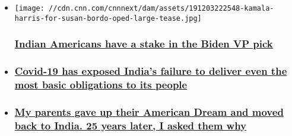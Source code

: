 \begin{itemize}
\item
  \href{/2020/08/03/opinions/kamala-harris-asian-americans-vp-pick-biden-makhija/index.html}{}

  \texttt{[image: //cdn.cnn.com/cnnnext/dam/assets/191203222548-kamala-harris-for-susan-bordo-oped-large-tease.jpg]}

  \hypertarget{indian-americans-have-a-stake-in-the-biden-vp-pick-1}{%
  \subsubsection{\texorpdfstring{\href{/2020/08/03/opinions/kamala-harris-asian-americans-vp-pick-biden-makhija/index.html}{Indian
  Americans have a stake in the Biden VP
  pick}}{Indian Americans have a stake in the Biden VP pick}}\label{indian-americans-have-a-stake-in-the-biden-vp-pick-1}}
\item
  \hypertarget{covid-19-has-exposed-indias-failure-to-deliver-even-the-most-basic-obligations-to-its-people}{%
  \subsubsection{\texorpdfstring{\href{/2020/07/18/opinions/india-coronavirus-failures-opinion-intl-hnk/index.html}{Covid-19
  has exposed India's failure to deliver even the most basic obligations
  to its
  people}}{Covid-19 has exposed India's failure to deliver even the most basic obligations to its people}}\label{covid-19-has-exposed-indias-failure-to-deliver-even-the-most-basic-obligations-to-its-people}}
\item
  \hypertarget{my-parents-gave-up-their-american-dream-and-moved-back-to-india-25-years-later-i-asked-them-why}{%
  \subsubsection{\texorpdfstring{\href{/2020/07/12/opinions/us-immigration-visa-iyengar-essay/index.html}{My
  parents gave up their American Dream and moved back to India. 25 years
  later, I asked them
  why}}{My parents gave up their American Dream and moved back to India. 25 years later, I asked them why}}\label{my-parents-gave-up-their-american-dream-and-moved-back-to-india-25-years-later-i-asked-them-why}}
\end{itemize}

